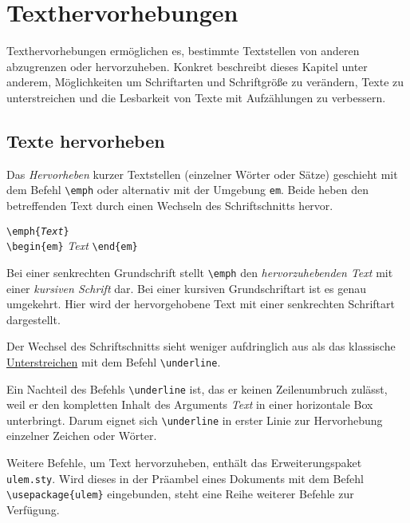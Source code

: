 \chapter{Texthervorhebungen}
\label{KapitelTexthervorhebungen}

Texthervorhebungen ermöglichen es, bestimmte 
Textstellen von anderen abzugrenzen oder hervorzuheben. Konkret beschreibt dieses
Kapitel unter anderem, Möglichkeiten um Schriftarten und Schriftgröße zu verändern, 
Texte zu unterstreichen und die Lesbarkeit von Texte mit Aufzählungen zu verbessern.

\section{Texte hervorheben}

Das \emph{Hervorheben} kurzer Textstellen (einzelner Wörter oder Sätze) geschieht 
mit dem Befehl \verb!\emph!  
oder alternativ mit der Umgebung \verb!em!. 
Beide heben den betreffenden Text durch einen Wechseln des Schriftschnitts hervor.

\begin{boxedminipage}{\textwidth}
\texttt{\textbackslash emph\{\textsl{Text}\}}\\
\texttt{\textbackslash begin\{em\}} \enskip \textsl{Text} \enskip \texttt{\textbackslash end\{em\}}
\end{boxedminipage}

Bei einer senkrechten Grundschrift stellt \verb!\emph! den 
\emph{hervorzuhebenden Text} mit einer \textsl{kursiven Schrift} dar. 
Bei einer kursiven Grundschriftart ist es genau 
umgekehrt. Hier wird der hervorgehobene Text mit einer senkrechten 
Schriftart dargestellt.

Der Wechsel des Schriftschnitts sieht weniger aufdringlich aus als das
klassische \underline{Unterstreichen} mit dem Befehl \verb!\underline!.  


Ein Nachteil des Befehls \verb!\underline! ist, das er keinen Zeilenumbruch zulässt, weil er den kompletten Inhalt des Arguments \textsl{Text} in einer horizontale Box unterbringt. Darum eignet sich \verb!\underline! in erster Linie zur Hervorhebung einzelner Zeichen oder Wörter.

Weitere Befehle, um Text hervorzuheben, enthält das Erweiterungspaket \verb!ulem.sty!. 
Wird dieses in der Präambel eines Dokuments mit dem Befehl \verb!\usepackage{ulem}! eingebunden, steht eine Reihe 
weiterer Befehle zur Verfügung.

